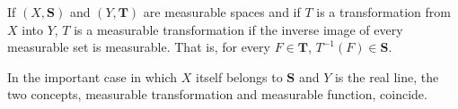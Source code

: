 If $(X, \mathbf{S})$ and $(Y, \mathbf{T})$ are measurable spaces and if $T$ is a transformation from $X$ into $Y$, $T$ is a measurable transformation if the inverse image of every measurable set is measurable. That is, for every $F \in \mathbf{T}$, $T^{-1}(F) \in \mathbf{S}$.

In the important case in which $X$ itself belongs to $\mathbf{S}$ and $Y$ is the real line, the two concepts, measurable transformation and measurable function, coincide.

